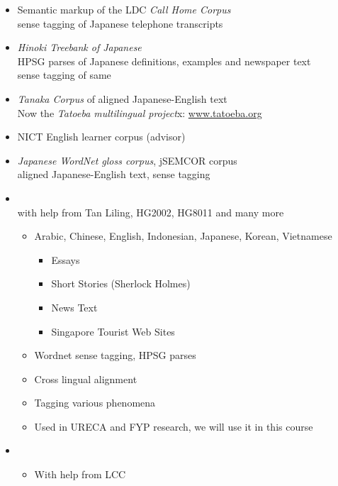 \documentclass[a4paper,landscape,headrule,footrule]{foils}
\begin{document}
\begin{itemize}
\item Semantic markup of the LDC \textit{Call Home Corpus}
\\ sense tagging of Japanese telephone transcripts
\item \textit{Hinoki Treebank of Japanese}
\\ HPSG parses of Japanese definitions, examples and newspaper text
\\ sense tagging of same
\item \textit{Tanaka Corpus} of aligned Japanese-English text
\\ Now the \textit{Tatoeba multilingual project}x: \url{www.tatoeba.org}
\item NICT English learner corpus (advisor)
\item \textit{Japanese WordNet gloss corpus}, jSEMCOR corpus
\\  aligned Japanese-English text, sense tagging
\end{itemize}

\begin{itemize}
\item \textbf{}
\\ with help from Tan Liling, HG2002, HG8011 and many more
  \begin{itemize}
  \item Arabic, Chinese, English, Indonesian, Japanese, Korean, Vietnamese
    \begin{itemize}
    \item Essays
    \item Short Stories (Sherlock Holmes)
    \item News Text
    \item Singapore Tourist Web Sites
    \end{itemize}
  \item Wordnet sense tagging, HPSG parses
  \item Cross lingual alignment
  \item Tagging various phenomena
  \item Used in URECA and FYP research, we will use it in this course
  \end{itemize}
\item {}
  \begin{itemize}
  \item With help from LCC
  \end{itemize}

\end{itemize}
\end{document}
